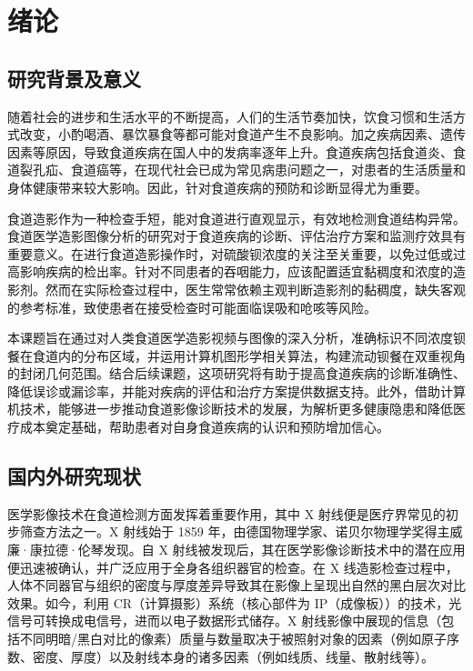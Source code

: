 \section{绪论}\label{sec:1}

\subsection{研究背景及意义}

随着社会的进步和生活水平的不断提高，人们的生活节奏加快，饮食习惯和生活方式改变，小酌喝酒、暴饮暴食等都可能对食道产生不良影响。加之疾病因素、遗传因素等原因，导致食道疾病在国人中的发病率逐年上升。食道疾病包括食道炎、食道裂孔疝、食道癌等，在现代社会已成为常见病患问题之一，对患者的生活质量和身体健康带来较大影响。因此，针对食道疾病的预防和诊断显得尤为重要。

食道造影作为一种检查手短，能对食道进行直观显示，有效地检测食道结构异常。食道医学造影图像分析的研究对于食道疾病的诊断、评估治疗方案和监测疗效具有重要意义。在进行食道造影操作时，对硫酸钡浓度的关注至关重要，以免过低或过高影响疾病的检出率。针对不同患者的吞咽能力，应该配置适宜黏稠度和浓度的造影剂。然而在实际检查过程中，医生常常依赖主观判断造影剂的黏稠度，缺失客观的参考标准，致使患者在接受检查时可能面临误吸和呛咳等风险。

本课题旨在通过对人类食道医学造影视频与图像的深入分析，准确标识不同浓度钡餐在食道内的分布区域，并运用计算机图形学相关算法，构建流动钡餐在双重视角的封闭几何范围。结合后续课题，这项研究将有助于提高食道疾病的诊断准确性、降低误诊或漏诊率，并能对疾病的评估和治疗方案提供数据支持。此外，借助计算机技术，能够进一步推动食道影像诊断技术的发展，为解析更多健康隐患和降低医疗成本奠定基础，帮助患者对自身食道疾病的认识和预防增加信心。

\subsection{国内外研究现状}

医学影像技术在食道检测方面发挥着重要作用，其中 X 射线便是医疗界常见的初步筛查方法之一。X 射线始于 1859 年，由德国物理学家、诺贝尔物理学奖得主威廉·康拉德·伦琴发现\cite{johansen1996circumstances}。自 X 射线被发现后，其在医学影像诊断技术中的潜在应用便迅速被确认，并广泛应用于全身各组织器官的检查。在 X 线造影检查过程中，人体不同器官与组织的密度与厚度差异导致其在影像上呈现出自然的黑白层次对比效果。如今，利用 CR（计算摄影）系统（核心部件为 IP（成像板））的技术，光信号可转换成电信号，进而以电子数据形式储存。X 射线影像中展现的信息（包括不同明暗/黑白对比的像素）质量与数量取决于被照射对象的因素（例如原子序数、密度、厚度）以及射线本身的诸多因素（例如线质、线量、散射线等）。

